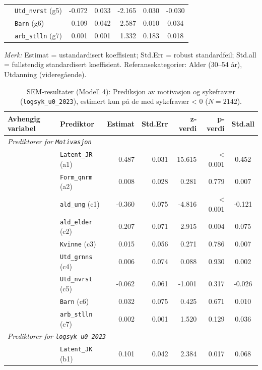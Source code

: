 \documentclass[
  12pt,
  a4paper,
  DIV=11,
  numbers=noendperiod]{scrartcl}
\begin{document}
\begin{table}[htbp]
\begin{tabular}{@{}llrrrrc@{}}
& \texttt{Utd\_nvrst} (g5)        & -0.072& 0.033 & -2.165 & 0.030   & -0.030 \\
& \texttt{Barn} (g6)              & 0.109 & 0.042 & 2.587  & 0.010   & 0.034 \\
& \texttt{arb\_stlln} (g7)        & 0.001 & 0.001 & 1.332  & 0.183   & 0.018 \\
\bottomrule
\end{tabular}
\footnotesize{%
\textit{Merk:} Estimat = ustandardisert koeffisient; Std.Err = robust standardfeil; Std.all = fullstendig standardisert koeffisient. Referansekategorier: Alder (30–54 år), Utdanning (videregående).}
\end{table}

\begin{table}[htbp]
\centering
\caption{SEM‐resultater (Modell 4): Prediksjon av motivasjon og sykefravær (\texttt{logsyk\_u0\_2023}), estimert kun på de med sykefravær < 0 ($N = 2142$).}
\label{tab:sem_results_model4}
\begin{tabular}{@{}llrrrrc@{}}
\toprule
Avhengig variabel & Prediktor & Estimat & Std.Err & z‐verdi & p‐verdi & Std.all \\
\midrule
\multicolumn{7}{l}{\textit{Prediktorer for \texttt{Motivasjon}}} \\
& \texttt{Latent\_JR} (a1)        & 0.487 & 0.031 & 15.615 & < 0.001 & 0.452 \\
& \texttt{Form\_qnrm} (a2)        & 0.008 & 0.028 & 0.281  & 0.779   & 0.007 \\
& \texttt{ald\_ung} (c1)          & -0.360& 0.075 & -4.816 & < 0.001 & -0.121 \\
& \texttt{ald\_elder} (c2)        & 0.207 & 0.071 & 2.915  & 0.004   & 0.075 \\
& \texttt{Kvinne} (c3)            & 0.015 & 0.056 & 0.271  & 0.786   & 0.007 \\
& \texttt{Utd\_grnns} (c4)        & 0.006 & 0.074 & 0.088  & 0.930   & 0.002 \\
& \texttt{Utd\_nvrst} (c5)        & -0.062& 0.061 & -1.001 & 0.317   & -0.026 \\
& \texttt{Barn} (c6)              & 0.032 & 0.075 & 0.425  & 0.671   & 0.010 \\
& \texttt{arb\_stlln} (c7)        & 0.002 & 0.001 & 1.520  & 0.129   & 0.036 \\
\midrule
\multicolumn{7}{l}{\textit{Prediktorer for \texttt{logsyk\_u0\_2023}}} \\
& \texttt{Latent\_JK} (b1)        & 0.101 & 0.042 & 2.384  & 0.017   & 0.068 \\

\end{tabular}
\end{table}
\end{document}

